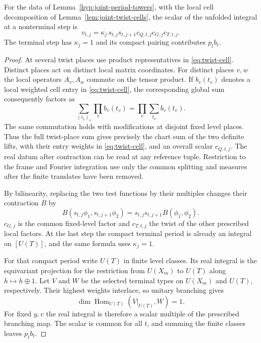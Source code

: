 \begin{proposition}\label{prop:joint-scalar-descent}
For the data of Lemma~\ref{hyp:joint-period-towers}, with the local cell
decomposition of Lemma~\ref{lem:joint-twist-cells}, the scalar of
the unfolded integral at a nonterminal step is
\[
 v_{t,j}=\kappa_j\,s_{t,j}s_{t,j+1}c_{Q,t,j}c_{G,j}c_{T,t,j}.
\]
The terminal step has \(\kappa_j=1\) and its compact pairing
contributes \(p_tb_t\).
\end{proposition}
\begin{proof}
At several twist places use product representatives in \eqref{eq:twist-cell}.
Distinct places act on distinct local
matrix coordinates. For distinct places \(v,w\) the local operators \(A_v,A_w\)
commute on the tensor product. If \(b_v(t_v)\) denotes a local
weighted cell entry in \eqref{eq:twist-cell}, the corresponding
global sum consequently factors as
\[
 \sum_{(t_v)_v}\prod_v b_v(t_v)=\prod_v\sum_{t_v} b_v(t_v).
\]
The same commutation holds with modifications at disjoint fixed
level places. Thus the full twist-place sum gives precisely the chart
sum of the two definite lifts, with their entry weights in
\eqref{eq:twist-cell}, and an overall scalar \(c_{Q,t,j}\).
The real datum after contraction can be read at any reference
tuple. Restriction to the frame and Fourier integration use only
the common splitting and measures after the finite translates have
been removed.

By bilinearity, replacing the two test functions by their
multiples changes their contraction \(B\) by
\[
 B(s_{t,j}\phi_1,s_{t,j+1}\phi_2)
                 =s_{t,j}s_{t,j+1}B(\phi_1,\phi_2).
\]
\(c_{G,j}\) is the common fixed-level factor and \(c_{T,t,j}\)
the twist of the other prescribed local factors. At the last
step the compact terminal period is already an integral on
\([U(T)]\), and the same formula uses \(\kappa_j=1\).

For that compact period write \(U(T)\) in finite level classes.
Its real integral is the equivariant projection for the
restriction from \(U(X_m)\) to \(U(T)\) along \(h\mapsto
h\oplus1\). Let \(V\) and \(W\) be the selected terminal types on \(U(X_m)\)
and \(U(T)\), respectively. Their highest weights interlace, so
unitary branching gives
\[
 \dim\operatorname{Hom}_{U(T)}(V|_{U(T)},W)=1 .
\]
For fixed \(y,v\) the real integral is therefore a scalar multiple
of the prescribed branching map. The scalar is common for all \(t\),
and summing the finite classes leaves \(p_tb_t\).
\end{proof}

